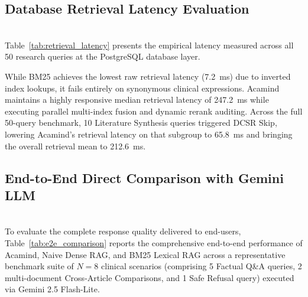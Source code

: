 \documentclass[10pt]{SPIIRAS_Proceedings}
\begin{document}
\subsection{Database Retrieval Latency Evaluation}~\\
\hspace*{\parindent}Table~\ref{tab:retrieval_latency} presents the empirical latency measured across all 50 research queries at the PostgreSQL database layer.

\begin{table}[H]
\centering
\caption{Empirical Retrieval Latency Performance across 50 Research Queries (PostgreSQL pgvector)}
\label{tab:retrieval_latency}
\end{table}

While BM25 achieves the lowest raw retrieval latency (7.2~ms) due to inverted index lookups, it fails entirely on synonymous clinical expressions. Acamind maintains a highly responsive median retrieval latency of 247.2~ms while executing parallel multi-index fusion and dynamic rerank auditing. Across the full 50-query benchmark, 10 Literature Synthesis queries triggered DCSR Skip, lowering Acamind's retrieval latency on that subgroup to 65.8~ms and bringing the overall retrieval mean to 212.6~ms.

\subsection{End-to-End Direct Comparison with Gemini LLM}~\\
\hspace*{\parindent}To evaluate the complete response quality delivered to end-users, Table~\ref{tab:e2e_comparison} reports the comprehensive end-to-end performance of Acamind, Naive Dense RAG, and BM25 Lexical RAG across a representative benchmark suite of $N = 8$ clinical scenarios (comprising 5 Factual Q\&A queries, 2 multi-document Cross-Article Comparisons, and 1 Safe Refusal query) executed via Gemini 2.5 Flash-Lite.
\end{document}
